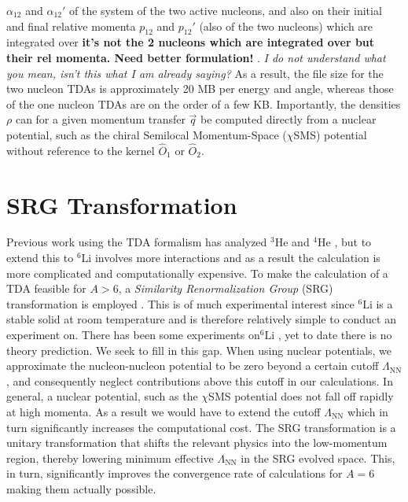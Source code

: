 \documentclass[a4paper,11pt]{article}
\newcommand{\LamNN}{\Lambda_{\mathrm{NN}}}
\newcommand{\LiS}{{}^{6} \mathrm{Li} }
\newcommand{\HeF}{{}^{4} \mathrm{He}}
\newcommand{\HeT}{{}^{3} \mathrm{He}}
\newcommand{\ques}[1]{\color{red}\textit{ #1 }\color{black}}
\newcommand{\com}[1]{\color{blue}\small\textbf{ #1 }\color{black}\normalsize}
\begin{document}
$\alpha_{12}$ and $\alpha_{12}'$ of the system of the two active nucleons, and also on their initial and final
relative momenta $p_{12}$ and $p_{12}'$ (also of the two nucleons) which are integrated over \com{it's not the 2 nucleons which are integrated over but their rel momenta. Need better formulation!}.\ques{I do not understand what you mean, isn't this what I am already saying?}
As a result, the file size for the two nucleon TDAs is approximately 20 MB
per energy and angle, whereas those of the one
nucleon TDAs are on the order of a few KB.
Importantly, the densities $\rho$ can for a given momentum transfer $\vec{q}$ be computed directly from a nuclear
potential, such as the chiral Semilocal Momentum-Space ($\chi$SMS) potential
\cite{Reinert2018}
without reference to the kernel $\hat{O}_1$ or $\hat{O}_{2}$.
\section{SRG Transformation}
Previous work using the TDA formalism has analyzed
$\HeT$ and $\HeF$
\cite{hammer2020, hammer4He}, but to extend this to $\LiS$ involves more interactions
and as a result the calculation is more complicated and computationally expensive.
To make the calculation of a TDA feasible for $A>6$, a
\textit{Similarity Renormalization Group} (SRG) transformation
is employed \cite{SRG, Furnstahl2013}.
This is of much experimental interest since $\LiS$ is a stable solid at room temperature and is
therefore relatively simple to conduct an experiment on.
There has been some experiments on$\LiS$ \cite{60MeV,86MeV}, yet to date there is no theory prediction.
We seek to fill in this gap.
When using nuclear potentials, we approximate the nucleon-nucleon potential to be zero
beyond a certain cutoff $\LamNN$, and consequently
neglect contributions above this cutoff in our calculations.
In general, a nuclear potential, such as the $\chi$SMS potential \cite{Reinert2018} does
not fall off rapidly at high momenta.
As a result we would have to
extend the cutoff $\LamNN$ which in turn significantly increases the computational cost.
The SRG transformation is a unitary transformation that
shifts the relevant physics into the low-momentum
region, thereby lowering minimum effective $\LamNN$ in the SRG evolved space.
This, in turn, significantly improves the convergence rate of calculations for $A=6$ making them actually possible.
\end{document}

